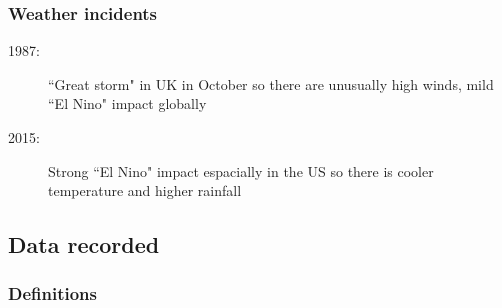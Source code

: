\documentclass[A4paper, 11pt]{article}
\begin{document}
	\subsubsection{Weather incidents}
	\begin{description}
		\item[1987:] ``Great storm" in UK in October so there are unusually high winds, mild ``El Nino" impact globally
		\item[2015:] Strong ``El Nino" impact espacially in the US so there is cooler temperature and higher rainfall
	\end{description}
	
	\subsection{Data recorded}
	\subsubsection{Definitions}
\end{document}

